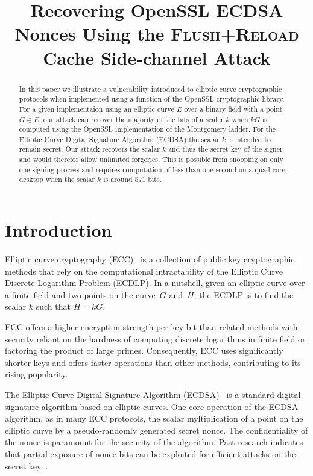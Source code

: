 \documentclass{llncs}
\begin{document}
\title{Recovering OpenSSL ECDSA Nonces Using the \textsc{Flush+Reload} Cache Side-channel Attack}

\maketitle

\begin{abstract}
In this paper we illustrate a vulnerability introduced to elliptic curve cryptographic protocols when implemented using a function of the OpenSSL cryptographic library. For a given implementaion using an elliptic curve $E$ over a binary field with a point $G\in E$, our attack can recover the majority of the bits of a scaler $k$ when $kG$ is computed using the OpenSSL implementation of the Montgomery ladder. For the Elliptic Curve Digital Signature Algorithm (ECDSA) the scalar $k$ is intended to remain secret. Our attack recovers the scalar $k$ and thus the secret key of the signer and would therefor allow unlimited forgeries. This is possible from snooping on only one signing process and requires computation of less than one second on a quad core desktop when the scalar $k$ is around 571 bits.

\end{abstract}

\section{Introduction}
Elliptic curve cryptography (ECC)~\cite{miller85use,koblitz87elliptic} is a collection of public key cryptographic methods that rely on the computational
intractability of the Elliptic Curve Discrete Logarithm Problem (ECDLP).
In a nutshell, given an elliptic curve over a finite field and two points on the curve~$G$ and~$H$,
the ECDLP is to find the scalar $k$ such that $H=kG$.

ECC offers a higher encryption strength per key-bit than related methods with security reliant on the hardness of computing discrete logarithms in finite field or factoring the product of large primes.
Consequently, ECC uses significantly shorter keys and offers faster operations than other methods, contributing to its rising popularity.

The Elliptic Curve Digital Signature Algorithm (ECDSA)~\cite{johnson01elliptic,fips186,ansi962} is a standard
digital signature algorithm based on elliptic curves. One core operation of the ECDSA algorithm, as in many ECC protocols, the scalar myltiplication of a point on the elliptic curve by a pseudo-randomly generated secret nonce. The confidentiality of the nonce is paramount for the security of the algorithm. Past research indicates that partial exposure of nonce bits can be exploited for efficient attacks on the secret key~\cite{nguyen03insecurity,brumley11remote}.
\end{document}

